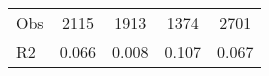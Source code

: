 \begin{tabular}{l*{4}{c}}
\hline                                                                                                                                                                                                                                            
 Obs                   &               2115               &       1913                       &       1374                &              2701                                               \\ 
 R2                    &                      0.066              &              0.008                      &              0.107               &                     0.067                                              \\ 
\hline \end{tabular}                                                                                                                                                                                                              